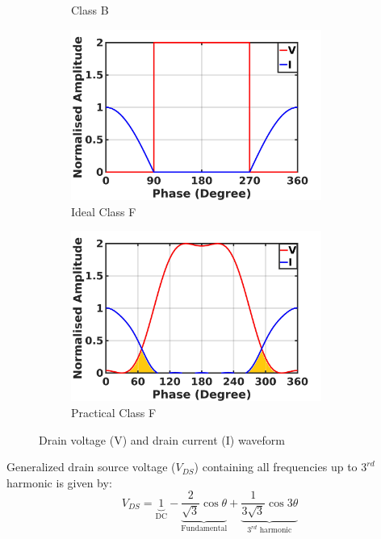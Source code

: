 \documentclass[conference]{IEEEtran}
\begin{document}
\begin{figure}[h]
\begin{subfigure}{0.24\textwidth}
\caption{Class B}
\label{fig:CB_wave_VI}
\end{subfigure}
\begin{subfigure}{0.24\textwidth}
\includegraphics[width=0.9\textwidth]{Images/Intro/ClassF.jpg}
\caption{Ideal Class F}
\label{fig:ICF_wave_VI}
\end{subfigure}
\begin{subfigure}{0.24\textwidth}
\includegraphics[width=0.9\textwidth]{Images/Intro/CF_wave_VI_shaded.jpg}
\caption{Practical Class F}
\label{fig:CF_wave_VI}
\end{subfigure}
\caption{Drain voltage (V) and drain current (I) waveform}
\label{fig:wave_VI}
\vspace{-0.25in}
\end{figure}
Generalized drain source voltage ($V_{DS}$) containing all frequencies up to $3^{rd}$ harmonic \cite{Gen_Vds_eqn} is given by:
\begin{equation}
V_{DS}=\underbrace{1}_{\text{DC}}-\underbrace{\frac{2}{\sqrt{3}} \cos \theta}_{\text{Fundamental}}+\underbrace{\frac{1}{3 \sqrt{3}} \cos 3 \theta}_{\text{$3^{rd}$ harmonic}}
\label{eqn_CF_V}
\end{equation}
\end{document}
